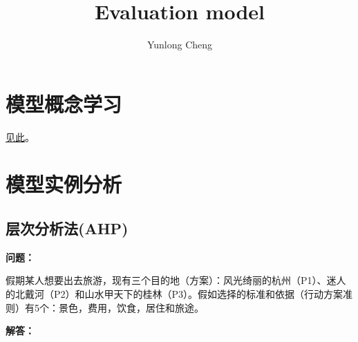 \documentclass[12pt,a4paper]{article}
\title{Evaluation model}
\author{Yunlong Cheng}
\begin{document}
\maketitle
\section{模型概念学习}
\href{run:../../7_14/cyl/LOG.pdf}{见此}。
\section{模型实例分析}
\subsection{层次分析法(AHP)}
\textbf{问题：}

假期某人想要出去旅游，现有三个目的地（方案）：风光绮丽的杭州（P1）、迷人的北戴河（P2）和山水甲天下的桂林（P3）。假如选择的标准和依据（行动方案准则）有5个：景色，费用，饮食，居住和旅途。

\textbf{解答：}
\end{document}
